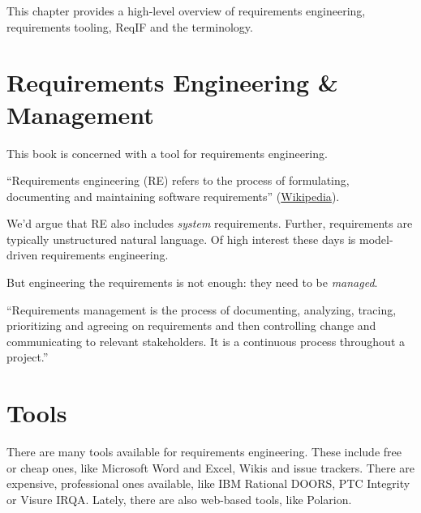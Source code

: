 This chapter provides a high-level overview of requirements engineering, requirements tooling, ReqIF and the terminology.

\section{Requirements Engineering \& Management}
\label{sec:requirements_engineering}

This book is concerned with \pror{} a tool for requirements engineering.

\begin{definition}
``Requirements engineering (RE) refers to the process of formulating, documenting and maintaining software requirements'' (\href{http://en.wikipedia.org/wiki/Requirements_engineering}{Wikipedia}).

We'd argue that RE also includes \textit{system} requirements.  Further, requirements are typically unstructured natural language.  Of high interest these days is model-driven requirements engineering.
\end{definition}

But engineering the requirements is not enough: they need to be \textit{managed}.

\begin{definition}
``Requirements management is the process of documenting, analyzing, tracing, prioritizing and agreeing on requirements and then controlling change and communicating to relevant stakeholders. It is a continuous process throughout a project.''
\end{definition}

\section{Tools}
\label{sec:re-tools}

There are many tools available for requirements engineering.  These include free or cheap ones, like Microsoft Word and Excel, Wikis and issue trackers.  There are expensive, professional ones available, like IBM Rational DOORS, PTC Integrity or Visure IRQA.  Lately, there are also web-based tools, like Polarion.

